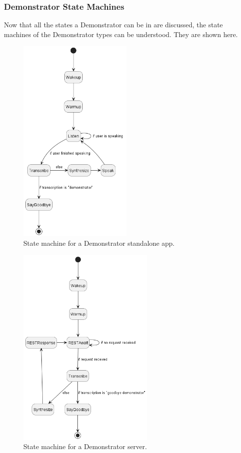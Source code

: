 \subsubsection{Demonstrator State Machines}
Now that all the states a Demonstrator can be in are discussed, the state machines of the Demonstrator types can be understood.
They are shown here.

\begin{figure}[h]
    \centering
    \includegraphics[width=0.5\textwidth]{../diagrams/state_app.png}
    \caption{State machine for a Demonstrator standalone app.}
    \label{fig:state_app}
\end{figure}
\newpage
\begin{figure}[h]
    \centering
    \includegraphics[width=0.6\textwidth]{../diagrams/state_server.png}
    \caption{State machine for a Demonstrator server.}
    \label{fig:state_server}
\end{figure}
